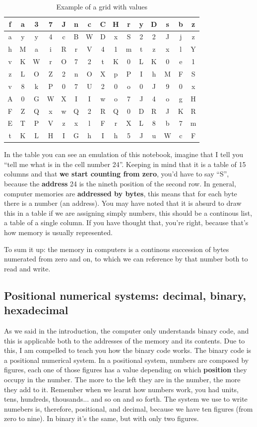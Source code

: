 \documentclass[a4paper]{article}
\begin{document}
\begin{table}[H]
    \centering
    \begin{tabular}{|c|c|c|c|c|c|c|c|c|c|c|c|c|c|c|}
        \hline
f&a&3&7&J&n&c&C&H&r&y&D&s&b&z\\\hline
a&y&y&4&c&B&W&D&x&S&2&2&J&j&z\\\hline
h&M&a&i&R&r&V&4&1&m&t&z&x&l&Y\\\hline
v&K&W&r&O&7&2&t&K&0&L&K&0&e&1\\\hline
z&L&O&Z&2&n&O&X&p&P&I&h&M&F&S\\\hline
v&8&k&P&0&7&U&2&0&o&0&J&9&0&x\\\hline
A&0&G&W&X&I&I&w&o&7&J&4&o&g&H\\\hline
F&Z&Q&x&w&Q&2&R&Q&0&D&R&J&K&R\\\hline
E&T&P&V&z&x&l&F&r&X&L&8&b&7&m\\\hline
t&K&L&H&I&G&h&I&h&5&J&u&W&c&F\\\hline
    \end{tabular}
    \caption{Example of a grid with values}
    \label{tab:notebookSimulation}
\end{table}

In the table you can see an emulation of this notebook, imagine that I tell
you ``tell me what is in the cell number 24''. Keeping in mind that it is
a table of 15 columns and that \textbf{we start counting from zero}, you'd have
to say ``S'', because the \textbf{address} 24 is the nineth position of the
second row. In general, computer memories are \textbf{addressed by bytes}, this
means that for each byte there is a number (an address). You may have noted that
it is absurd to draw this in a table if we are assigning simply numbers, this
should be a continous list, a table of a single column. If you have thought
that, you're right, because that's how memory is usually represented.

To sum it up: the memory in computers is a continous succession of bytes
numerated from zero and on, to which we can reference by that number
both to read and write.

\subsection{Positional numerical systems: decimal, binary, hexadecimal}
\label{numericSystems}
As we said in the introduction, the computer only understands binary code,
and this is applicable both to the addresses of the memory and its contents.
Due to this, I am compelled to teach you how the binary code works. The binary
code is a positional numerical system. In a positional system, numbers are
composed by figures, each one of those figures has a value depending on which
\textbf{position} they occupy in the number. The more to the left they are in
the number, the more they add to it. Remember when we learnt how numbers work,
you had units, tens, hundreds, thousands... and so on and so forth. The system
we use to write numebers is, therefore, positional, and decimal, because we have
ten figures (from zero to nine). In binary it's the same, but with only two
figures.
\end{document}
